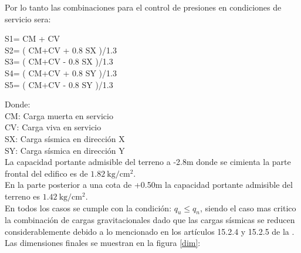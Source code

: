 \documentclass{article}%
\begin{document}
\newpage
\noindent Por lo tanto las combinaciones para el control de presiones en condiciones de servicio sera:
\begin{center}
    S1= CM + CV\\
    S2= ( CM+CV + 0.8 SX )/1.3\\
    S3= ( CM+CV - 0.8 SX )/1.3\\
    S4= ( CM+CV + 0.8 SY )/1.3\\
    S5= ( CM+CV - 0.8 SY )/1.3 
\end{center}
\noindent 
Donde:\\
CM: Carga muerta en servicio\\
CV: Carga viva en servicio\\
SX: Carga sísmica en dirección X\\
SY: Carga sísmica en dirección Y\\

%
\noindent
La capacidad portante admisible del terreno a -2.8m donde se cimienta la parte frontal del edifico es de $1.82\mathrm{~kg/cm^2} $.\\
En la parte posterior a una cota de +0.50m la capacidad portante admisible del terreno es $1.42\mathrm{~kg/cm^2}$.\\
En todos los casos se cumple con la condición: $q_{u}\leq q_{n}$, siendo el caso mas critico la combinación de cargas gravitacionales dado que las cargas sísmicas se reducen considerablemente debido a lo mencionado en los artículos 15.2.4 y 15.2.5 de la \cite{E-060}.\\
Las dimensiones finales se muestran en la figura \ref{dim}:
%
\newpage
\end{document}
